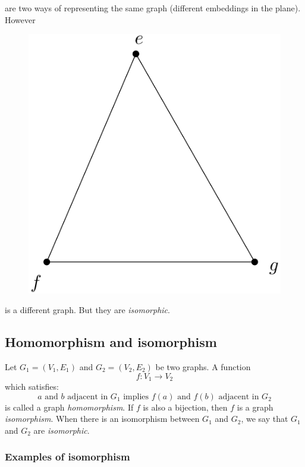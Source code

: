 \documentclass[11pt]{article}
\begin{document}
    are two ways of representing the same graph (different embeddings in the plane). However

    \begin{figure}[H]
        \centering
        \includegraphics[scale=0.2]{triangle2.png}
    \end{figure}

    is a different graph. But they are \emph{isomorphic}.

    \subsection{Homomorphism and isomorphism}

    Let \(G_1 = (V_1, E_1)\) and \(G_2 = (V_2, E_2)\) be two graphs. A function \[f:V_1 \rightarrow V_2\] which satisfies: \[\text{$a$ and $b$ adjacent in $G_1$ implies $f(a)$ and $f(b)$ adjacent in $G_2$}\] is called a graph \emph{homomorphism}. If $f$ is also a bijection, then $f$ is a graph \emph{isomorphism}. When there is an isomorphism between \(G_1\) and \(G_2\), we say that \(G_1\) and \(G_2\) are \emph{isomorphic}.

    \subsubsection{Examples of isomorphism}
\end{document}
